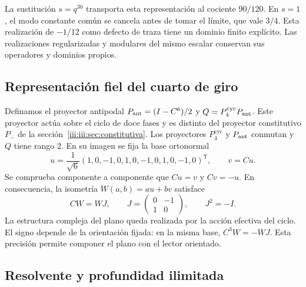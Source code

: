 La sustitución $s=q^{30}$ transporta esta representación al cociente
$90/120$. En $s=1$, el modo constante común se cancela antes de tomar el
límite, que vale $3/4$. Esta realización de $-1/12$ como defecto de traza
tiene un dominio finito explícito. Las realizaciones regularizadas y
modulares del mismo escalar conservan sus operadores y dominios propios.

\subsection{Representación fiel del cuarto de giro}

Definamos el proyector antipodal $P_{\rm ant}=(I-C^6)/2$ y
$Q=P_4^{\mathrm{cyc}}P_{\rm ant}$. Este proyector actúa sobre el ciclo de doce fases y es
distinto del proyector constitutivo $P_-$ de la sección~\ref{iii:iii:sec:constitutiva}.
Los proyectores $P_4^{\mathrm{cyc}}$ y $P_{\rm ant}$ conmutan y
$Q$ tiene rango $2$. En su imagen se fija la base ortonormal
\begin{equation}
 u=\frac1{\sqrt6}(1,0,-1,0,1,0,-1,0,1,0,-1,0)^{\mathsf T},
 \qquad v=Cu.
 \label{iii:iii:eq:uv}
\end{equation}
Se comprueba componente a componente que $Cu=v$ y $Cv=-u$. En consecuencia,
la isometría $W(a,b)=au+bv$ satisface
\begin{equation}
 CW=WJ,\qquad
 J=\begin{pmatrix}0&-1\\1&0\end{pmatrix},\qquad J^2=-I.
 \label{iii:iii:eq:quarter-intertwiner}
\end{equation}
La estructura compleja del plano queda realizada por la acción efectiva del
ciclo. El signo depende de la orientación fijada: en la misma base,
$C^3W=-WJ$. Esta precisión permite componer el plano con el lector orientado.

\subsection{Resolvente y profundidad ilimitada}

